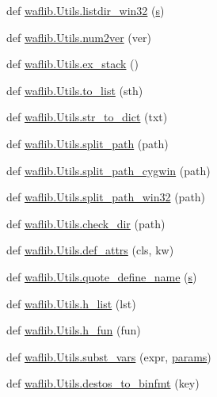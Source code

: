 \begin{DoxyCompactItemize}
\item 
def \hyperlink{namespacewaflib_1_1_utils_ac9a7b4f41109b8fff23f384df18dce13}{waflib.\+Utils.\+listdir\+\_\+win32} (\hyperlink{lib_2expat_8h_a755339d27872b13735c2cab829e47157}{s})
\item 
def \hyperlink{namespacewaflib_1_1_utils_a18633c8155ce7c6bb9069810180554e9}{waflib.\+Utils.\+num2ver} (ver)
\item 
def \hyperlink{namespacewaflib_1_1_utils_ad05a0a58c9d618c414f4bb8031af8554}{waflib.\+Utils.\+ex\+\_\+stack} ()
\item 
def \hyperlink{namespacewaflib_1_1_utils_ac7225ebfc537755c9bc4c59e571dabac}{waflib.\+Utils.\+to\+\_\+list} (sth)
\item 
def \hyperlink{namespacewaflib_1_1_utils_a8b8fbf885d8a703285f5ad23698dc288}{waflib.\+Utils.\+str\+\_\+to\+\_\+dict} (txt)
\item 
def \hyperlink{namespacewaflib_1_1_utils_af8f22d8c94f643274d83d9e499b7b6fb}{waflib.\+Utils.\+split\+\_\+path} (path)
\item 
def \hyperlink{namespacewaflib_1_1_utils_acc4e10c273d8d6cb32cc0cbdd8e9882f}{waflib.\+Utils.\+split\+\_\+path\+\_\+cygwin} (path)
\item 
def \hyperlink{namespacewaflib_1_1_utils_a9e33bebc9a981fe1167f2baf6a668867}{waflib.\+Utils.\+split\+\_\+path\+\_\+win32} (path)
\item 
def \hyperlink{namespacewaflib_1_1_utils_a7371a28757bf958283282cc340bd3983}{waflib.\+Utils.\+check\+\_\+dir} (path)
\item 
def \hyperlink{namespacewaflib_1_1_utils_a1bad8c8b483664adbcb626d613889765}{waflib.\+Utils.\+def\+\_\+attrs} (cls, kw)
\item 
def \hyperlink{namespacewaflib_1_1_utils_a03c8a270ecb9309553fd1cadbc95c1d3}{waflib.\+Utils.\+quote\+\_\+define\+\_\+name} (\hyperlink{lib_2expat_8h_a755339d27872b13735c2cab829e47157}{s})
\item 
def \hyperlink{namespacewaflib_1_1_utils_ab3bfd24c87f933a7abd202473853d794}{waflib.\+Utils.\+h\+\_\+list} (lst)
\item 
def \hyperlink{namespacewaflib_1_1_utils_a166c5b8b989396bc542f21c68051f72e}{waflib.\+Utils.\+h\+\_\+fun} (fun)
\item 
def \hyperlink{namespacewaflib_1_1_utils_a4a2954f3765db0e5e3f035082267c6a8}{waflib.\+Utils.\+subst\+\_\+vars} (expr, \hyperlink{_reverb_8cpp_aacc5617877d2aa4d17c729c1c8ba4eec}{params})
\item 
def \hyperlink{namespacewaflib_1_1_utils_a1bce2a571cc984820dc1707f20e9284a}{waflib.\+Utils.\+destos\+\_\+to\+\_\+binfmt} (key)

\end{DoxyCompactItemize}
